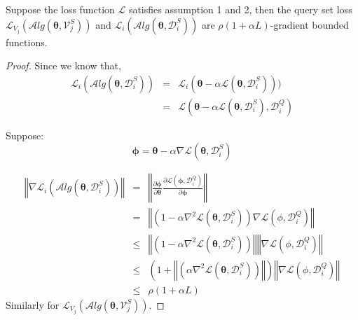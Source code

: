 \begin{lemma} \label{queryloss-gradient_bound}
Suppose the loss function $\mathcal{L}$ satisfies assumption 1 and 2, then the query set loss $\mathcal{L}_{V_j}(\mathcal{A}lg(\boldsymbol{\theta},\mathcal{V}_j^{S}))$ and $\mathcal{L}_{i}(\mathcal{A}lg(\boldsymbol{\theta},\mathcal{D}_i^{S}))$  are $\rho(1+\alpha L)$-gradient bounded functions.\\
\end{lemma}
\begin{proof}
Since we know that,
\begin{eqnarray}
    \mathcal{L}_{i}(\mathcal{A}lg(\boldsymbol{\theta},\mathcal{D}_i^{S})) &=& \mathcal{L}_{i}(\boldsymbol{\theta} - \alpha\mathcal{L}(\boldsymbol{\theta}, \mathcal{D}_i^{S}))) \nonumber\\
    &=& \mathcal{L}(\boldsymbol{\theta} - \alpha\mathcal{L}(\boldsymbol{\theta}, \mathcal{D}_i^{S}), \mathcal{D}_i^{Q})
\end{eqnarray}
    

Suppose:
$$
\boldsymbol{\phi}=\boldsymbol{\theta}-\alpha \nabla \mathcal{L}(\boldsymbol{\theta}, \mathcal{D}_i^{S})
$$

\begin{eqnarray}
    \left\Vert\nabla\mathcal{L}_{i}(\mathcal{A}lg(\boldsymbol{\theta},\mathcal{D}_i^{S}))\right\Vert 
    &=&\left\Vert \frac{\partial \boldsymbol{\phi}}{\partial \boldsymbol{\theta}} \frac{\partial \mathcal{L}(\boldsymbol{\phi},\mathcal{D}_i^{Q})}{\partial \boldsymbol{\phi}} \right\Vert \nonumber\\
    &=&\left\Vert (1-\alpha \nabla^2\mathcal{L}(\boldsymbol{\theta},\mathcal{D}_i^S))\nabla\mathcal{L}(\phi, \mathcal{D}_i^Q) \right\Vert \nonumber\\
    &\leq&\left\Vert (1-\alpha \nabla^2\mathcal{L}(\boldsymbol{\theta},\mathcal{D}_i^S))\right\Vert \left\Vert\nabla\mathcal{L}(\phi, \mathcal{D}_i^Q) \right\Vert \nonumber\\
    &\leq& (1+\left\Vert (\alpha \nabla^2\mathcal{L}(\boldsymbol{\theta},\mathcal{D}_i^S))\right\Vert) \left\Vert\nabla\mathcal{L}(\phi, \mathcal{D}_i^Q) \right\Vert \nonumber\\
    &\leq&\rho (1+\alpha L)
\end{eqnarray}
Similarly for $\mathcal{L}_{V_j}(\mathcal{A}lg(\boldsymbol{\theta},\mathcal{V}_j^{S}))$.
\end{proof}



